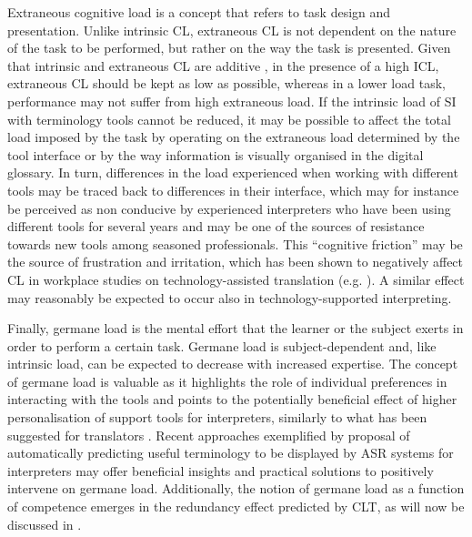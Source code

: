 Extraneous cognitive load is a concept that refers to task design and presentation. Unlike intrinsic CL, extraneous CL is not dependent on the nature of the task to be performed, but rather on the way the task is presented. Given that intrinsic and extraneous CL are additive \citep[150]{van_merrienboer_cognitive_2005}, in the presence of a high ICL, extraneous CL should be kept as low as possible, whereas in a lower load task, performance may not suffer from high extraneous load. If the intrinsic load of SI with terminology tools cannot be reduced, it may be possible to affect the total load imposed by the task by operating on the extraneous load determined by the tool interface or by the way information is visually organised in the digital glossary. In turn, differences in the load experienced when working with different tools may be traced back to differences in their interface, which may for instance be perceived as non conducive by experienced interpreters who have been using different tools for several years and may be one of the sources of resistance towards new tools among seasoned professionals. This ``cognitive friction'' \citep[19]{cooper_inmates_2004} may be the source of frustration and irritation, which has been shown to negatively affect CL in workplace studies on technology-assisted translation (e.g. \citealt{bundgaard_translator-computer_2016,risku_investigating_2019}). A similar effect may reasonably be expected to occur also in technology-supported interpreting.

Finally, germane load is the mental effort that the learner or the subject exerts in order to perform a certain task. Germane load is subject-dependent and, like intrinsic load, can be expected to decrease with increased expertise. The concept of germane load is valuable as it highlights the role of individual preferences in interacting with the tools and points to the potentially beneficial effect of higher personalisation of support tools for interpreters, similarly to what has been suggested for translators \citep{taravella_acknowledging_2013}. Recent approaches exemplified by  proposal of automatically predicting useful terminology to be displayed by ASR systems for interpreters may offer beneficial insights and practical solutions to positively intervene on germane load. Additionally, the notion of germane load as a function of competence emerges in the redundancy effect predicted by CLT, as will now be discussed in .


